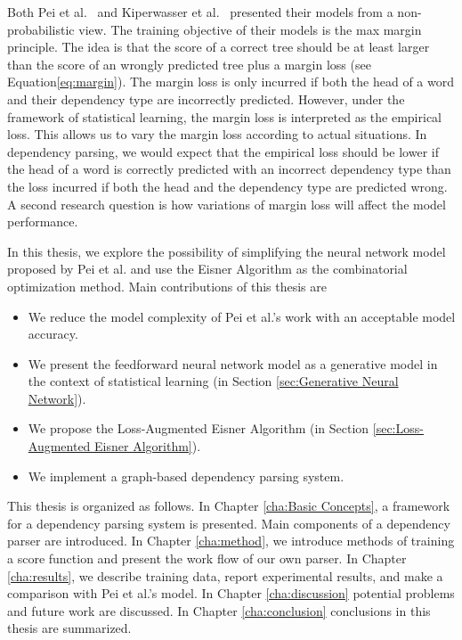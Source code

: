 Both Pei et al.\ \cite{pei2015} and Kiperwasser et al.\ \cite{kiperwasser2016simple} presented their models from a non-probabilistic view. The training objective of their models is the max margin principle. The idea is that the score of a correct tree should be at least larger than the score of an wrongly predicted tree plus a margin loss (see Equation\ref{eq:margin}). The margin loss is only incurred if both the head of a word and their dependency type are incorrectly predicted. However, under the framework of statistical learning, the margin loss is interpreted as the empirical loss. This allows us to vary the margin loss according to actual situations. In dependency parsing, we would expect that the empirical loss should be lower if the head of a word is correctly predicted with an incorrect dependency type than the loss incurred if both the head and the dependency type are predicted wrong. A second research question is how variations of margin loss will affect the model performance.

In this thesis, we explore the possibility of simplifying the neural network model proposed by Pei et al. \cite{pei2015} and use the Eisner Algorithm as the combinatorial optimization method. 
Main contributions of this thesis are 
\begin{itemize}  
\item We reduce the model complexity of Pei et al.'s work \cite{pei2015} with an acceptable model accuracy. 
\item We present the feedforward neural network model as a generative model in the context of statistical learning (in Section \ref{sec:Generative Neural Network}).
\item We propose the Loss-Augmented Eisner Algorithm (in Section \ref{sec:Loss-Augmented Eisner Algorithm}).
\item We implement a graph-based dependency parsing system.
\end{itemize}

This thesis is organized as follows. In Chapter \ref{cha:Basic Concepts}, a framework for a dependency parsing system is presented. Main components of a dependency parser are introduced. In Chapter \ref{cha:method}, we introduce methods of training a score function and present the work flow of our own parser. In Chapter \ref{cha:results}, we describe training data, report experimental results, and make a comparison with Pei et al.'s model. In Chapter \ref{cha:discussion} potential problems and future work are discussed.  In Chapter \ref{cha:conclusion} conclusions in this thesis are summarized.

